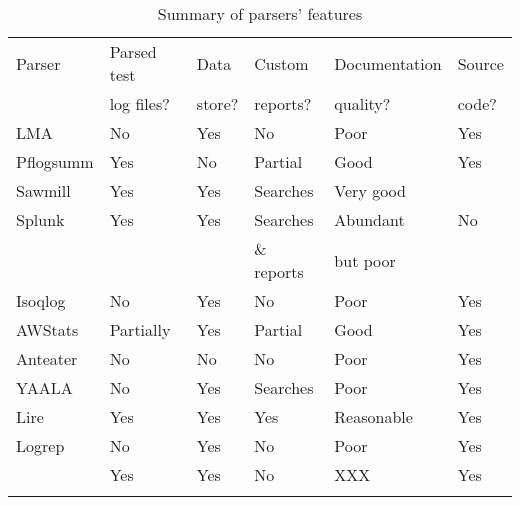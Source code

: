 \begin{table}[htb]
    \caption{Summary of parsers' features}
    \empty{}\label{Summary of parsers' features}
    \begin{tabular}{llllll}
        \tabletopline{}%
        Parser          & Parsed test   & Data              & Custom            & Documentation  & Source       \\
                        & log files?    & store?            & reports?          & quality?       & code?        \\
        \tablemiddleline{}%
        \gls{LMA}       & No            & Yes               & No                & Poor           & Yes          \\ 
        Pflogsumm       & Yes           & No                & Partial \dag{}    & Good           & Yes          \\
        Sawmill         & Yes           & Yes               & Searches          & Very good      & \nialpha{}   \\
        Splunk          & Yes           & Yes               & Searches          & Abundant       & No           \\
                        &               &                   & \& reports        & but poor       &              \\
        Isoqlog         & No            & Yes               & No                & Poor           & Yes          \\
        AWStats         & Partially     & Yes               & Partial \dag{}    & Good           & Yes          \\
        Anteater        & No            & No                & No                & Poor           & Yes          \\
        YAALA           & No            & Yes \ddag{}       & Searches          & Poor           & Yes          \\
        Lire            & Yes           & Yes               & Yes               & Reasonable     & Yes          \\
        Logrep          & No            & Yes               & No                & Poor           & Yes          \\
        \parsername{}   & Yes           & Yes \nibeta{}     & No \nichi{}       & XXX            & Yes          \\
        \tablebottomline{}%
    \end{tabular}

    \begin{eqlist}


\end{eqlist}
\end{table}
